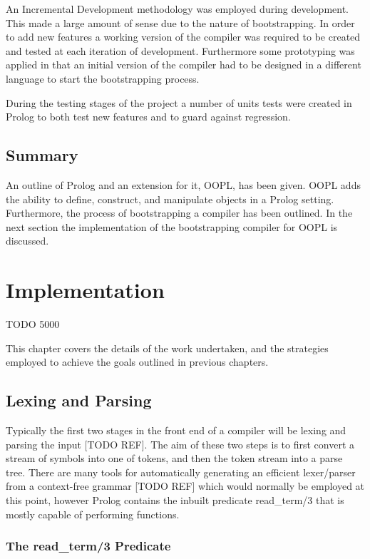 \documentclass[12pt,a4paper,twoside,openright]{report}
\begin{document}
An Incremental Development methodology was employed during development. This made a large amount of sense due to the nature of bootstrapping. In order to add new features a working version of the compiler was required to be created and tested at each iteration of development. Furthermore some prototyping was applied in that an initial version of the compiler had to be designed in a different language to start the bootstrapping process.

\bigskip

During the testing stages of the project a number of units tests were created in Prolog to both test new features and to guard against regression. 

\section {Summary}

An outline of Prolog and an extension for it, OOPL, has been given. OOPL adds the ability to define, construct, and manipulate objects in a Prolog setting. Furthermore, the process of bootstrapping a compiler has been outlined. In the next section the implementation of the bootstrapping compiler for OOPL is discussed.

\chapter{Implementation}

TODO 5000

This chapter covers the details of the work undertaken, and the strategies employed to achieve the goals outlined in previous chapters.

\section{Lexing and Parsing}

Typically the first two stages in the front end of a compiler will be lexing and parsing the input [TODO REF]. The aim of these two steps is to first convert a stream of symbols into one of tokens, and then the token stream into a parse tree. There are many tools for automatically generating an efficient lexer/parser from a context-free grammar [TODO REF] which would normally be employed at this point, however Prolog contains the inbuilt predicate read_term/3 that is mostly capable of performing functions.

\subsection{The read_term/3 Predicate}
\end{document}
